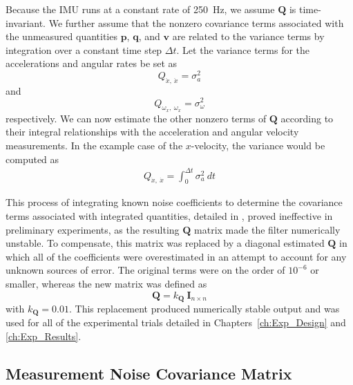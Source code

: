 Because the IMU runs at a constant rate of 250~Hz, we assume $\mathbf{Q}$ is time-invariant. We further assume that the nonzero covariance terms associated with the unmeasured quantities $\mathbf{p}$, $\mathbf{q}$, and $\mathbf{v}$ are related to the variance terms by integration over a constant time step $\Delta t$. Let the variance terms for the accelerations and angular rates be set as
%
\begin{equation}
Q_{\ddot{x},\ \ddot{x}} = \sigma_{a}^{2}
\end{equation}
%
and
%
\begin{equation}
Q_{\omega_{x},\ \omega_{x}} = \sigma_{\omega}^{2}
\end{equation}
%
respectively. We can now estimate the other nonzero terms of $\mathbf{Q}$ according to their integral relationships with the acceleration and angular velocity measurements. In the example case of the $x$-velocity, the variance would be computed as
%
\begin{align}
Q_{\dot{x},\ \dot{x}} = \int^{\Delta t}_{0} \sigma_{a}^2\ dt
\end{align}

This process of integrating known noise coefficients to determine the covariance terms associated with integrated quantities, detailed in \cite{Brown2012}, proved ineffective in preliminary experiments, as the resulting $\mathbf{Q}$ matrix made the filter numerically unstable. To compensate, this matrix was replaced by a diagonal estimated $\mathbf{Q}$ in which all of the coefficients were overestimated in an attempt to account for any unknown sources of error. The original terms were on the order of $10^{-6}$ or smaller, whereas the new matrix was defined as
%
\begin{equation}
\mathbf{Q} = k_{\mathbf{Q}}\ \mathbf{I}_{n \times n}
\end{equation}
%
with $k_{\mathbf{Q}} = 0.01$. This replacement produced numerically stable output and was used for all of the experimental trials detailed in Chapters~\ref{ch:Exp_Design} and \ref{ch:Exp_Results}.

\subsection{Measurement Noise Covariance Matrix} \label{sec:R_Matrix}

